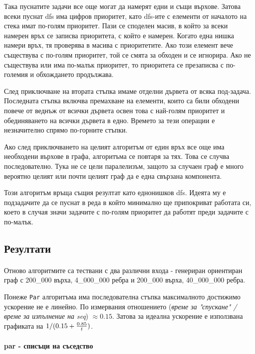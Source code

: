 Така пуснатите задачи все още могат да намерят едни и същи върхове. Затова всеки пуснат dfs има цифров приоритет, като dfs-ите с елементи от началото на стека имат по-голям приоритет. Пази се споделен масив, в който за всеки намерен връх се записва приоритета, с който е намерен. Когато една нишка намери връх, тя проверява в масива с приоритетите. Ако този елемент вече съществува с по-голям приоритет, той се смята за обходен и се игнорира. Ако не съществува или има по-малък приоритет, то приоритета се презаписва с по-големия и обхождането продължава.

След приключване на втората стъпка имаме отделни дървета от всяка под-задача. Последната стъпка включва премахване на елементи, които са били обходени повече от веднъж от всички дървета освен това с най-голям приоритет и обединяването на всички дървета в едно. Времето за тези операции е незначително спрямо по-горните стъпки.

Ако след приключването на целият алгоритъм от един връх все още има необходени върхове в графа, алгоритъма се повтаря за тях. Това се случва последователно. Тука не се цели паралелизъм, защото за случаен граф е много вероятно целият или почти целият граф да е една свързана компонента.

Този алгоритъм връща същия резултат като еднонишков dfs. Идеята му е подзадачите да се пуснат в реда в който минимално ще припокриват работата си, което в случая значи задачите с по-голям приоритет да работят преди задачите с по-малък.

\subsection{Резултати}

\paragraph*{} Отново алгоритмите са тествани с два различни входа - генериран ориентиран граф с 200\_000 върха, 4\_000\_000 ребра и 200\_000 върха, 40\_000\_000 ребра.

Понеже \verb|Par| алгоритъма има последователна стъпка максималното достижимо ускорение не е линейно. По измервания отношението (\textit{време за "спускане" / време за изпълнение на seq}) $\approx 0.15$. Затова за идеална ускорение е използвана графиката на $1 / (0.15 + {0.85 \over t})$.

\paragraph*{par - списъци на съседство}


